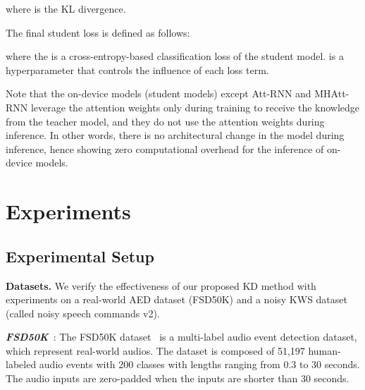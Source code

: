 \documentclass{article}
\begin{document}
where  is the KL divergence.

The final student loss  is defined as follows:

where the  is a cross-entropy-based classification loss of the student model.
 is a hyperparameter that controls the influence of each loss term.

Note that the on-device models (student models) except Att-RNN and MHAtt-RNN leverage the attention weights only during training to receive the knowledge from the teacher model, and they do not use the attention weights during inference.
In other words, there is no architectural change in the model during inference, hence showing zero computational overhead for the inference of on-device models.
 \section{Experiments}\label{sec:3_experiment}
\subsection{Experimental Setup}\label{subsec:3_1_experimental_setup}
\textbf{Datasets.}
We verify the effectiveness of our proposed KD method with experiments on a real-world AED dataset (FSD50K) and a noisy KWS dataset (called noisy speech commands v2).

\textbf{\textit{FSD50K}}~\cite{fonseca2020fsd50k}:
The FSD50K dataset~\cite{fonseca2020fsd50k} is a multi-label audio event detection dataset, which represent real-world audios.
The dataset is composed of 51,197 human-labeled audio events with 200 classes with lengths ranging from 0.3 to 30 seconds. 
The audio inputs are zero-padded when the inputs are shorter than 30 seconds.
\end{document}
